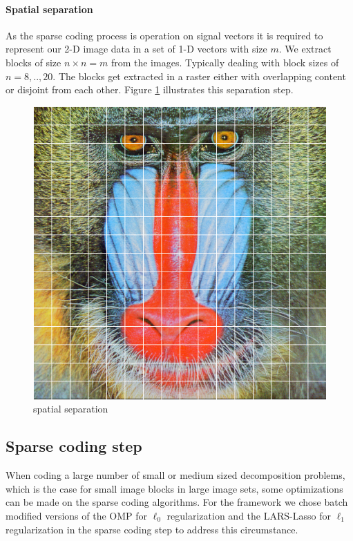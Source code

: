 \paragraph{Spatial separation}
As the sparse coding process is operation on signal vectors it is required to
represent our 2-D image data in a set of 1-D vectors with size $m$. We extract
blocks of size $n \times n=m$ from the images. Typically dealing with block
sizes of $n=8,..,20$. The blocks get extracted in a raster either with
overlapping content or disjoint from each other. Figure \ref{fig:separation}
illustrates this separation step.
\begin{figure}[h]
\centering
\includegraphics[scale = 0.25]{images/segmentation.png}
\caption{spatial separation}
\label{fig:separation}
\end{figure}

\subsection{Sparse coding step}
When coding a large number of small or medium sized decomposition problems,
which is the case for small image blocks in large image sets, some
optimizations can be made on the sparse coding algorithms. 
For the framework we chose batch modified versions of the OMP for $\ell_0$
regularization and the LARS-Lasso for $\ell_1$ regularization in the sparse
coding step to address this circumstance. 

